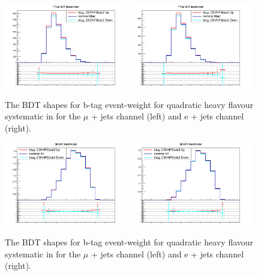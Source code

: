 \begin{figure}[ht!]
    \includegraphics[width=0.48\textwidth]{images/Run2/Sys/btag_CSVHFStats2systt.png}
    \includegraphics[width=0.48\textwidth]{images/Run2/Sys/btag_CSVHFStats2systt_e.png}     
    \caption{The BDT shapes for b-tag event-weight for quadratic heavy flavour systematic in \ttbar for the $\mu$ + jets channel (left) and e + jets channel (right).}
    \label{fig:SysShapesHFStatstt2}
\end{figure}
\begin{figure}[ht!]
    \includegraphics[width=0.48\textwidth]{images/Run2/Sys/btag_CSVHFStats2systttt.png}
    \includegraphics[width=0.48\textwidth]{images/Run2/Sys/btag_CSVHFStats2systttt_e.png}     
    \caption{The BDT shapes for b-tag event-weight for quadratic heavy flavour systematic in \tttt for the $\mu$ + jets channel (left) and e + jets channel (right).}
    \label{fig:SysShapesHFStatstttt2}
\end{figure}
